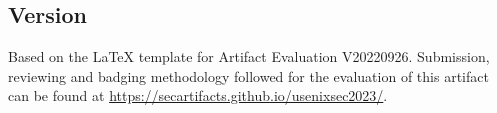 

\subsection{Version}
Based on the LaTeX template for Artifact Evaluation V20220926. Submission,
reviewing and badging methodology followed for the evaluation of this artifact
can be found at \url{https://secartifacts.github.io/usenixsec2023/}.